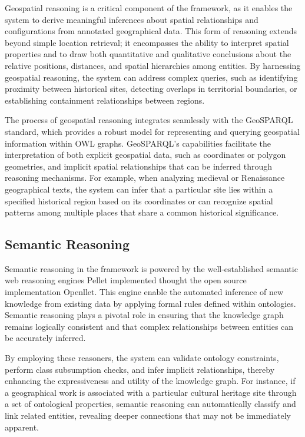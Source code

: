 Geospatial reasoning is a critical component of the framework, as it enables the system to derive meaningful inferences about spatial relationships and configurations from annotated geographical data. This form of reasoning extends beyond simple location retrieval; it encompasses the ability to interpret spatial properties and to draw both quantitative and qualitative conclusions about the relative positions, distances, and spatial hierarchies among entities. By harnessing geospatial reasoning, the system can address complex queries, such as identifying proximity between historical sites, detecting overlaps in territorial boundaries, or establishing containment relationships between regions.

The process of geospatial reasoning integrates seamlessly with the GeoSPARQL standard, which provides a robust model for representing and querying geospatial information within OWL graphs. GeoSPARQL’s capabilities facilitate the interpretation of both explicit geospatial data, such as coordinates or polygon geometries, and implicit spatial relationships that can be inferred through reasoning mechanisms. For example, when analyzing medieval or Renaissance geographical texts, the system can infer that a particular site lies within a specified historical region based on its coordinates or can recognize spatial patterns among multiple places that share a common historical significance.

\subsection{Semantic Reasoning}\label{VI-subsec:semanticReasoning}

Semantic reasoning in the framework is powered by the well-established semantic web reasoning engines  Pellet\cite{sirinPelletPracticalOWLDL2007} implemented thought the open source implementation Openllet\cite{galigatorGaligatorOpenllet2024}. This engine enable the automated inference of new knowledge from existing data by applying formal rules defined within ontologies. Semantic reasoning plays a pivotal role in ensuring that the knowledge graph remains logically consistent and that complex relationships between entities can be accurately inferred.

By employing these reasoners, the system can validate ontology constraints, perform class subsumption checks, and infer implicit relationships, thereby enhancing the expressiveness and utility of the knowledge graph. For instance, if a geographical work is associated with a particular cultural heritage site through a set of ontological properties, semantic reasoning can automatically classify and link related entities, revealing deeper connections that may not be immediately apparent.


